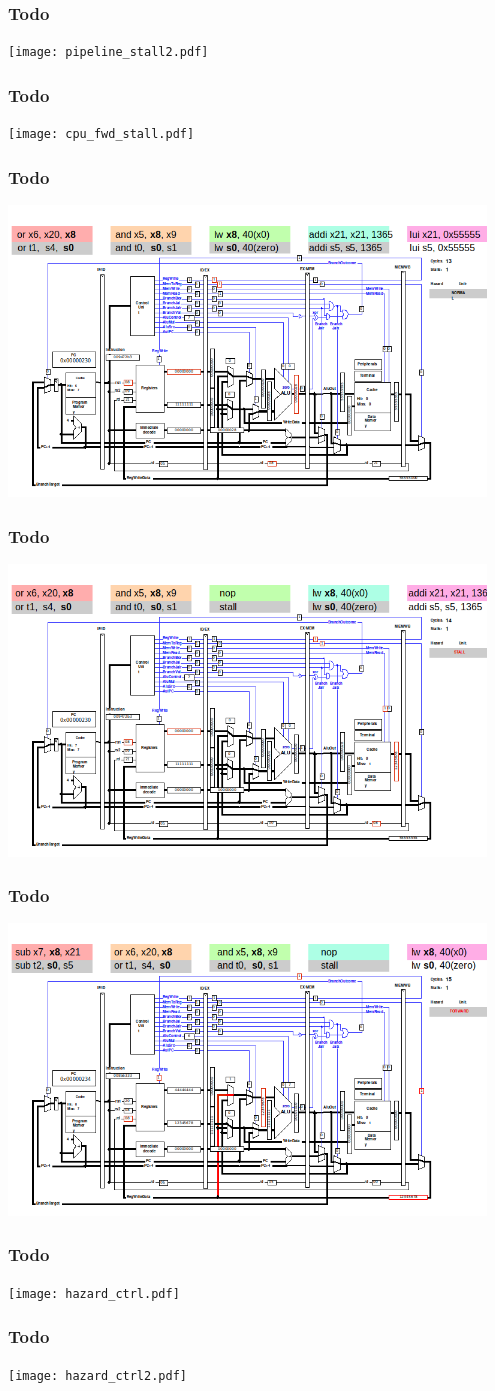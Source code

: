 \documentclass{beamer}
\begin{document}
\begin{frame}
\frametitle{Todo}
\texttt{[image: pipeline\_stall2.pdf]}
\end{frame}

\begin{frame}
\frametitle{Todo}
\texttt{[image: cpu\_fwd\_stall.pdf]}
\end{frame}

\begin{frame}
\frametitle{Todo}
\includegraphics[width=0.95\textwidth]{fig/hazard-stall-qtrvsim2.png}
\end{frame}

\begin{frame}
\frametitle{Todo}
\includegraphics[width=0.95\textwidth]{fig/hazard-stall-qtrvsim3.png}
\end{frame}

\begin{frame}
\frametitle{Todo}
\includegraphics[width=0.95\textwidth]{fig/hazard-stall-qtrvsim4.png}
\end{frame}

\begin{frame}
\frametitle{Todo}
\texttt{[image: hazard\_ctrl.pdf]}
\end{frame}

\begin{frame}
\frametitle{Todo}
\texttt{[image: hazard\_ctrl2.pdf]}
\end{frame}
\end{document}
